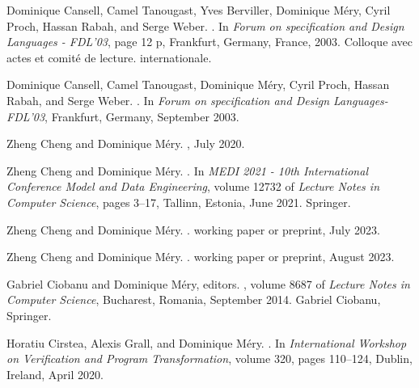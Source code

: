 \documentclass[ 12pt]{article}
\begin{document}
\begin{thebibliography}{100}
Dominique Cansell, Camel Tanougast, Yves Berviller, Dominique M{\'e}ry, Cyril
  Proch, Hassan Rabah, and Serge Weber.
.
\newblock In {\em {Forum on specification and Design Languages - FDL'03}}, page
  12 p, Frankfurt, Germany, France, 2003.
\newblock Colloque avec actes et comit{\'e} de lecture. internationale.

Dominique Cansell, Camel Tanougast, Dominique M{\'e}ry, Cyril Proch, Hassan
  Rabah, and Serge Weber.
.
\newblock In {\em {Forum on specification and Design Languages-FDL'03}},
  Frankfurt, Germany, September 2003.

Zheng Cheng and Dominique M{\'e}ry.
, July 2020.

Zheng Cheng and Dominique M{\'e}ry.
.
\newblock In {\em {MEDI 2021 - 10th International Conference Model and Data
  Engineering}}, volume 12732 of {\em Lecture Notes in Computer Science}, pages
  3--17, Tallinn, Estonia, June 2021. {Springer}.

Zheng Cheng and Dominique M{\'e}ry.
.
\newblock working paper or preprint, July 2023.

Zheng Cheng and Dominique M{\'e}ry.
.
\newblock working paper or preprint, August 2023.

Gabriel Ciobanu and Dominique M{\'e}ry, editors.
, volume 8687
  of {\em Lecture Notes in Computer Science}, Bucharest, Romania, September
  2014. {Gabriel Ciobanu}, {Springer}.

Horatiu Cirstea, Alexis Grall, and Dominique M{\'e}ry.
.
\newblock In {\em {International Workshop on Verification and Program
  Transformation}}, volume 320, pages 110--124, Dublin, Ireland, April 2020.


\end{thebibliography}
\end{document}
